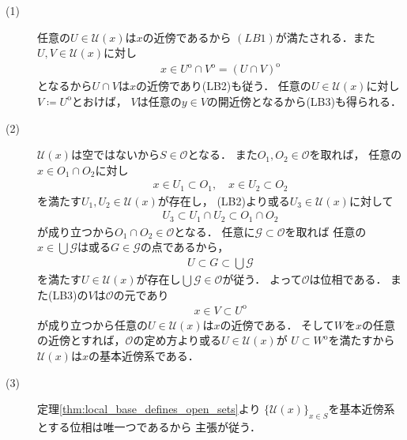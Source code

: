	\begin{prf}\mbox{}
		\begin{description}
			\item[(1)] 任意の$U \in \mathscr{U}(x)$は$x$の近傍であるから
				$(LB1)$が満たされる．また$U,V \in \mathscr{U}(x)$に対し
				\begin{align}
					x \in U^{\mathrm{o}} \cap V^{\mathrm{o}} = (U \cap V)^{\mathrm{o}}
				\end{align}
				となるから$U \cap V$は$x$の近傍であり(LB2)も従う．
				任意の$U \in \mathscr{U}(x)$に対し$V \coloneqq U^{\mathrm{o}}$とおけば，
				$V$は任意の$y \in V$の開近傍となるから(LB3)も得られる．
			
			\item[(2)] 
				$\mathscr{U}(x)$は空ではないから$S \in \mathscr{O}$となる．
				また$O_1,O_2 \in \mathscr{O}$を取れば，
				任意の$x \in O_1 \cap O_2$に対し
				\begin{align}
					x \in U_1 \subset O_1,
					\quad x \in U_2 \subset O_2
				\end{align}
				を満たす$U_1,U_2 \in \mathscr{U}(x)$が存在し，
				(LB2)より或る$U_3 \in \mathscr{U}(x)$に対して
				\begin{align}
					U_3 \subset U_1 \cap U_2 \subset O_1 \cap O_2
				\end{align}
				が成り立つから$O_1 \cap O_2 \in \mathscr{O}$となる．
				任意に$\mathscr{G} \subset \mathscr{O}$を取れば
				任意の$x \in \bigcup \mathscr{G}$は或る$G \in \mathscr{G}$の点であるから，
				\begin{align}
					U \subset G \subset \bigcup \mathscr{G}
				\end{align}
				を満たす$U \in \mathscr{U}(x)$が存在し$\bigcup \mathscr{G} \in \mathscr{O}$が従う．
				よって$\mathscr{O}$は位相である．
				また(LB3)の$V$は$\mathscr{O}$の元であり
				\begin{align}
					x \in V \subset U^{\mathrm{o}}
				\end{align}
				が成り立つから任意の$U \in \mathscr{U}(x)$は$x$の近傍である．
				そして$W$を$x$の任意の近傍とすれば，$\mathscr{O}$の定め方より或る$U \in \mathscr{U}(x)$が
				$U \subset W^{\mathrm{o}}$を満たすから$\mathscr{U}(x)$は$x$の基本近傍系である．
			
			\item[(3)] 
				定理\ref{thm:local_base_defines_open_sets}より
				$\{\mathscr{U}(x)\}_{x \in S}$を基本近傍系とする位相は唯一つであるから
				主張が従う．
				\QED
		\end{description}
	\end{prf}
	
